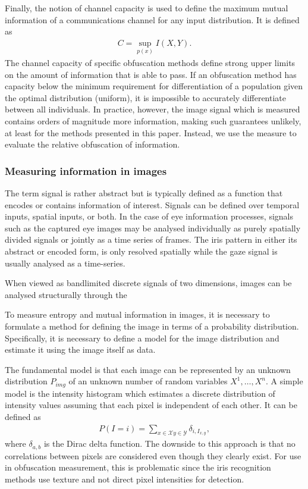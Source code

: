 Finally, the notion of channel capacity is used to define the maximum mutual information of a communications channel for any input distribution. It is defined as
\begin{align}
    C = \sup_{p(x)} I(X, Y).
\end{align}
The channel capacity of specific obfuscation methods define strong upper limits on the amount of information that is able to pass. If an obfuscation method has capacity below the minimum requirement for differentiation of a population given the optimal distribution (uniform), it is impossible to accurately differentiate between all individuals. In practice, however, the image signal which is measured contains orders of magnitude more information, making such guarantees unlikely, at least for the methods presented in this paper. Instead, we use the measure to evaluate the relative obfuscation of information.



\subsubsection{Measuring information in images}
The term signal is rather abstract but is typically defined as a function that encodes or contains information of interest. Signals can be defined over temporal inputs, spatial inputs, or both. In the case of eye information processes, signals such as the captured eye images may be analysed individually as purely spatially divided signals or jointly as a time series of frames. The iris pattern in either its abstract or encoded form, is only resolved spatially while the gaze signal is usually analysed as a time-series. 




When viewed as bandlimited discrete signals of two dimensions, images can be analysed structurally through the 

To measure entropy and mutual information in images, it is necessary to formulate a method for defining the image in terms of a probability distribution. Specifically, it is necessary to define a model for the image distribution and estimate it using the image itself as data.

The fundamental model is that each image can be represented by an unknown distribution $P_{img}$ of an unknown number of random variables $X^1, \dots, X^n$. A simple model is the intensity histogram which estimates a discrete distribution of intensity values assuming that each pixel is independent of each other. It can be defined as
\begin{align}
    P(I=i) = \sum_{x\in\mathcal{X}y\in\mathcal{Y}} \delta_{i, I_{x,y}},
\end{align}
where $\delta_{a, b}$ is the Dirac delta function. The downside to this approach is that no correlations between pixels are considered even though they clearly exist. For use in obfuscation measurement, this is problematic since the iris recognition methods use texture and not direct pixel intensities for detection. 

